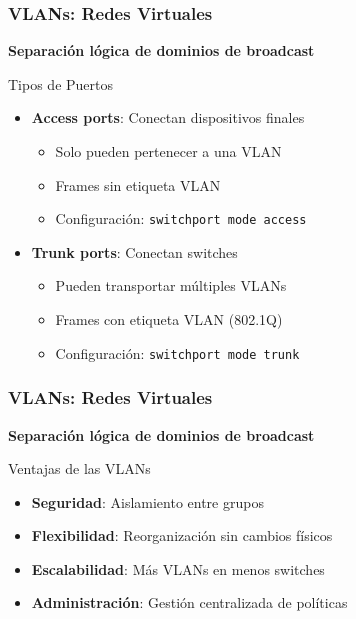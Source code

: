\documentclass[aspectratio=169]{beamer}
\begin{document}
            \begin{frame}
            \frametitle{VLANs: Redes Virtuales}
            \begin{center}
            \Large \textbf{Separación lógica de dominios de broadcast}
            \end{center}
            
            \begin{block}{Tipos de Puertos}
            \begin{itemize}
            \item \textbf{Access ports}: Conectan dispositivos finales
              \begin{itemize}
              \item Solo pueden pertenecer a una VLAN
              \item Frames sin etiqueta VLAN
              \item Configuración: \texttt{switchport mode access}
              \end{itemize}
            \item \textbf{Trunk ports}: Conectan switches
              \begin{itemize}
              \item Pueden transportar múltiples VLANs
              \item Frames con etiqueta VLAN (802.1Q)
              \item Configuración: \texttt{switchport mode trunk}
              \end{itemize}
            \end{itemize}
            \end{block}
            \end{frame}  
            

          \begin{frame}
            \frametitle{VLANs: Redes Virtuales}
            \begin{center}
            \Large \textbf{Separación lógica de dominios de broadcast}
            \end{center}
            \begin{block}{Ventajas de las VLANs}
            \begin{itemize}
            \item \textbf{Seguridad}: Aislamiento entre grupos
            \item \textbf{Flexibilidad}: Reorganización sin cambios físicos
            \item \textbf{Escalabilidad}: Más VLANs en menos switches
            \item \textbf{Administración}: Gestión centralizada de políticas
            \end{itemize}
            \end{block}
            \end{frame}
            
\end{document}
